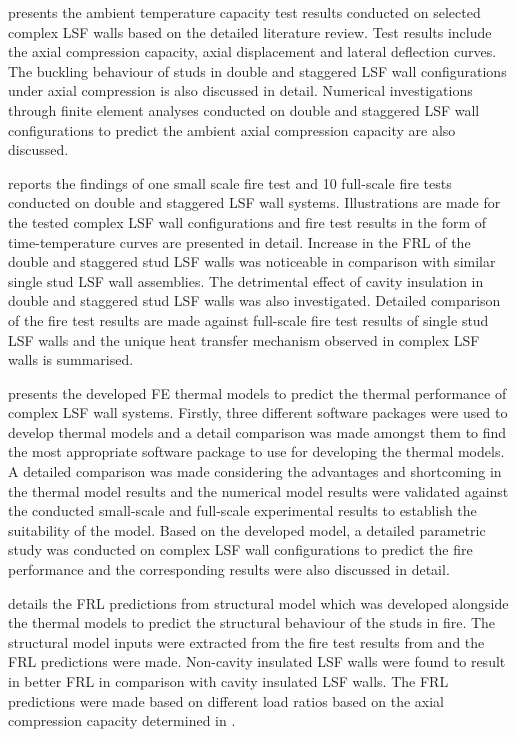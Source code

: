 \textbf{} presents the ambient temperature capacity test results conducted on selected complex LSF walls based on the detailed literature review. Test results include the axial compression capacity, axial displacement and lateral deflection curves. The buckling behaviour of studs in double and staggered LSF wall configurations under axial compression is also discussed in detail. Numerical investigations through finite element analyses conducted on double and staggered LSF wall configurations to predict the ambient axial compression capacity are also discussed. 

\textbf{} reports the findings of one small scale fire test and 10 full-scale fire tests conducted on double and staggered LSF wall systems. Illustrations are made for the tested complex LSF wall configurations and fire test results in the form of time-temperature curves are presented in detail. Increase in the FRL of the double and staggered stud LSF walls was noticeable in comparison with similar single stud LSF wall assemblies. The detrimental effect of cavity insulation in double and staggered stud LSF walls was also investigated. Detailed comparison of the fire test results are made against full-scale fire test results of single stud LSF walls and the unique heat transfer mechanism observed in complex LSF walls is summarised. 

\textbf{} presents the developed FE thermal models to predict the thermal performance of complex LSF wall systems. Firstly, three different software packages were used to develop thermal models and a detail comparison was made amongst them to find the most appropriate software package to use for developing the thermal models. A detailed comparison was made considering the advantages and shortcoming in the thermal model results and the numerical model results were validated against the conducted small-scale and full-scale experimental results to establish the suitability of the model. Based on the developed model, a detailed parametric study was conducted on complex LSF wall configurations to predict the fire performance and the corresponding results were also discussed in detail.

\textbf{} details the FRL predictions from structural model which was developed alongside the thermal models to predict the structural behaviour of the studs in fire. The structural model inputs were extracted from the fire test results from  and the FRL predictions were made. Non-cavity insulated LSF walls were found to result in better FRL in comparison with cavity insulated LSF walls. The FRL predictions were made based on different load ratios based on the axial compression capacity determined in .


